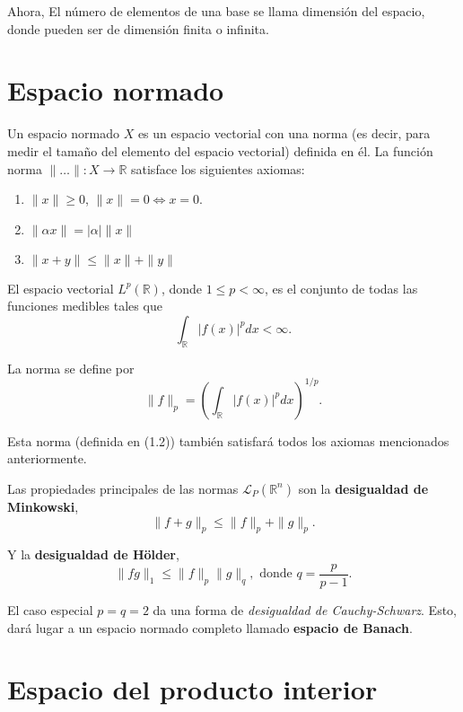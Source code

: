 \begin{multicols}{2}
Ahora, El número de elementos de una base se llama dimensión del espacio, donde pueden ser de dimensión finita o infinita.

\section{Espacio normado}

Un espacio normado $X$ es un espacio vectorial con una norma (es decir, para medir el tamaño del elemento del espacio vectorial) definida en él. La función norma $\|\ldots\| : X \to \mathbb{R}$ satisface los siguientes axiomas:
    \begin{enumerate}[\bfseries (i)]
	\item $\|x\|\geq 0$, $\|x\| = 0 \Leftrightarrow x = 0$.
	\item $\|\alpha x\| = |\alpha|\|x\|$ 
	\item $\|x+y\| \leq \|x\| + \|y\|$
    \end{enumerate}

\vspace{0.5cm}

\begin{ejemplo}
    El espacio vectorial $L^p(\mathbb{R})$, donde $1 \leq p < \infty$, es el conjunto de todas las funciones medibles tales que 
    $$\int_{\mathbb{R}} |f(x)|^p dx < \infty.$$ 

    La norma se define por 
    $$\|f\|_p = \left(\int_{\mathbb{R}} |f(x)|^p dx\right)^{1/p}.$$ 

    Esta norma (definida en (1.2)) también satisfará todos los axiomas mencionados anteriormente.
\label{ejemplo:1.1}
\end{ejemplo}

Las propiedades principales de las normas $\mathcal{L}_P(\mathbb{R}^n)$ son la \textbf{desigualdad de Minkowski}, 
\begin{equation}
    \|f+g\|_p \leq \|f\|_p + \|g\|_p.
\label{eq:Minkowski}
\end{equation}

Y la \textbf{desigualdad de Hölder},
\begin{equation}
    \|fg\|_1 \leq \|f\|_p\|g\|_q, \text{ donde } q=\dfrac{p}{p-1}.
\label{eq:Holder}
\end{equation}

El caso especial $p = q = 2$ da una forma de \textit{desigualdad de Cauchy-Schwarz}. Esto, dará lugar a un espacio normado completo llamado \textbf{espacio de Banach}.


\section{Espacio del producto interior}


\end{multicols}

